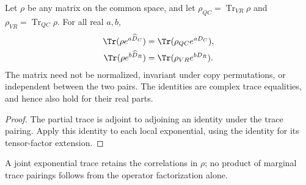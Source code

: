 \begin{theorem}
\label{thm:pair_merge_deficit_traces}
\leanok
{}
Let $\rho$ be any matrix on the common space, and let
$\rho_{QC}=\operatorname{Tr}_{VR}\rho$ and
$\rho_{VR}=\operatorname{Tr}_{QC}\rho$. For all real $a,b$,
\begin{align}
 \Tr(\rho e^{a\widehat D_C})&=\Tr(\rho_{QC}e^{aD_C}),
 \label{eq:pair_merge_deficit_trace_left}\\
 \Tr(\rho e^{b\widehat D_R})&=\Tr(\rho_{VR}e^{bD_R}).
 \label{eq:pair_merge_deficit_trace_right}
\end{align}
The matrix need not be normalized, invariant under copy permutations,
or independent between the two pairs. The identities are complex trace
equalities, and hence also hold for their real parts.
\end{theorem}
\begin{proof}
\leanok
The partial trace is adjoint to adjoining an identity under the trace
pairing. Apply this identity to each local exponential, using the
identity for its tensor-factor extension.
\end{proof}

A joint exponential trace retains the correlations in $\rho$; no product of marginal trace
pairings follows from the operator factorization alone.
